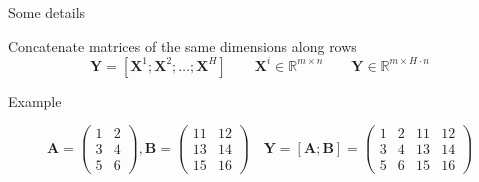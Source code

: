 \documentclass[12pt,aspectratio=169,handout]{beamer}
\begin{document}
\begin{frame}{Some details}
	
Concatenate matrices of the same dimensions along rows
$$\bm{Y} = [\bm{X}^1 ; \bm{X}^2 ; \ldots ; \bm{X}^H]
\qquad
\bm{X}^i \in \mathbb{R}^{m \times n}
\qquad
\bm{Y} \in \mathbb{R}^{m \times H \cdot n}$$

\begin{block}{Example}
\begin{small}
	$$
	\bm{A} =
	\begin{pmatrix}
		1 & 2 \\
		3 & 4 \\
		5 & 6
	\end{pmatrix}
	,
	\bm{B} =
	\begin{pmatrix}
		11 & 12 \\
		13 & 14 \\
		15 & 16
	\end{pmatrix}
	\quad
	\bm{Y} = [\bm{A} ; \bm{B} ] =
	\begin{pmatrix}
		1 & 2 & 11 & 12 \\
		3 & 4 & 13 & 14 \\
		5 & 6 & 15 & 16
	\end{pmatrix}
	$$
\end{small}
\end{block}
	
	
\end{frame}
\end{document}
